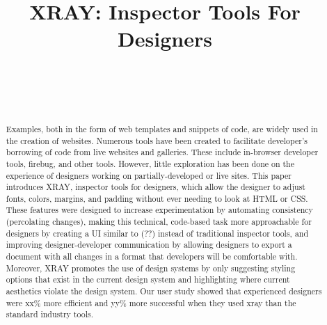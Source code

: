 \documentclass{sigchi}
\def\plaintitle{XRAY: Inspector Tools For Designers}
\begin{document}
\title{\plaintitle}

\author{%
  \\
  \\
  \\
}

\maketitle

\begin{abstract}
Examples, both in the form of web templates and snippets of code, are widely used in the creation of websites. Numerous tools have been created to facilitate developer's borrowing of code from live websites and galleries. 
These include in-browser developer tools, firebug, and other tools. However, little exploration has been done on the experience of designers working on partially-developed or live sites. This paper introduces XRAY, inspector tools for designers, which allow the designer to adjust fonts, colors, margins, and padding without ever needing to look at HTML or CSS. These features were designed to increase experimentation by automating consistency (percolating changes), making this technical, code-based task more approachable for designers by creating a UI similar to (??) instead of traditional inspector tools, and improving designer-developer communication by allowing designers to export a document with all changes in a format that developers will be comfortable with. Moreover, XRAY 
promotes the use of design systems by only suggesting styling options that exist in the current design system and highlighting where current aesthetics violate the design system. Our user study showed that experienced designers were xx\% more efficient and yy\% more successful when they used xray than the standard industry tools. 
\end{abstract}
\end{document}
